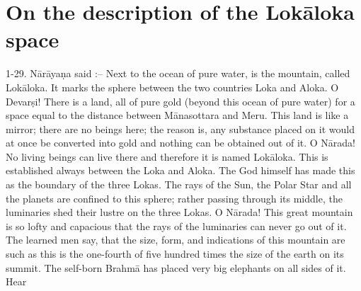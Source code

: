 \chapter{On the description of the Lok\=aloka space}

1-29. N\=ar\=aya\d{n}a said :-- Next to the ocean of pure water, is the mountain, called Lok\=aloka. It marks the sphere between the two countries Loka and Aloka. O Devar\d{s}i! There is a land, all of pure gold (beyond this ocean of pure water) for a space equal to the distance between M\=anasottara and Meru. This land is like a mirror; there are no beings here; the reason is, any substance placed on it would at once be converted into gold and nothing can be obtained out of it. O N\=arada! No living beings can live there and therefore it is named Lok\=aloka. This is established always between the Loka and Aloka. The God himself has made this as the boundary of the three Lokas. The rays of the Sun, the Polar Star and all the planets are confined to this sphere; rather passing through its middle, the luminaries shed their lustre on the three Lokas. O N\=arada! This great mountain is so lofty and capacious that the rays of the luminaries can never go out of it. The learned men say, that the size, form, and indications of this mountain are such as this is the one-fourth of five hundred times the size of the earth on its summit. The self-born Brahm\=a has placed very big elephants on all sides of it. Hear

